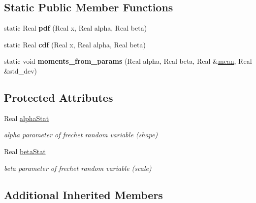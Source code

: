 \subsection*{Static Public Member Functions}
\begin{DoxyCompactItemize}
\item 
static Real {\bfseries pdf} (Real x, Real alpha, Real beta)\label{classPecos_1_1FrechetRandomVariable_a739d94cef9ee188f00056e229ca3fd95}

\item 
static Real {\bfseries cdf} (Real x, Real alpha, Real beta)\label{classPecos_1_1FrechetRandomVariable_a6ccc276bca2bfdfd6f320c65a6c8aaf7}

\item 
static void {\bfseries moments\+\_\+from\+\_\+params} (Real alpha, Real beta, Real \&\hyperlink{classPecos_1_1FrechetRandomVariable_a962ffe5a3593be370d5c883365c060f4}{mean}, Real \&std\+\_\+dev)\label{classPecos_1_1FrechetRandomVariable_af6459b831a8e62a41f7eab34d06edad8}

\end{DoxyCompactItemize}
\subsection*{Protected Attributes}
\begin{DoxyCompactItemize}
\item 
Real \hyperlink{classPecos_1_1FrechetRandomVariable_aa48da95b9214d9cf933e1d4625e32e84}{alpha\+Stat}\label{classPecos_1_1FrechetRandomVariable_aa48da95b9214d9cf933e1d4625e32e84}

\begin{DoxyCompactList}\small\item\em alpha parameter of frechet random variable (shape) \end{DoxyCompactList}\item 
Real \hyperlink{classPecos_1_1FrechetRandomVariable_a838d220373c3360feec45e853b0daaac}{beta\+Stat}\label{classPecos_1_1FrechetRandomVariable_a838d220373c3360feec45e853b0daaac}

\begin{DoxyCompactList}\small\item\em beta parameter of frechet random variable (scale) \end{DoxyCompactList}\end{DoxyCompactItemize}
\subsection*{Additional Inherited Members}


